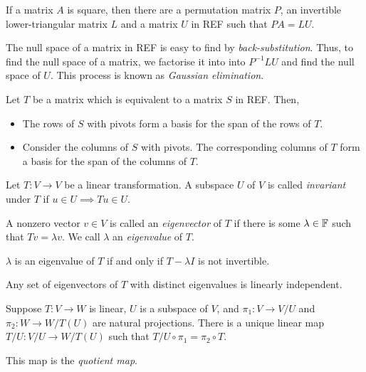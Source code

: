 \begin{prop}[$LU$ Factorisation]
    If a matrix $A$ is square, then there are a permutation matrix $P$, an
    invertible lower-triangular matrix $L$ and a matrix $U$ in REF
    such that $PA=LU$.
\end{prop}
\begin{rem}
    The null space of a matrix in REF is easy to find by
    \emph{back-substitution}.
    Thus, to find the null space of a matrix, we factorise it into into
    $P^{-1}LU$ and find the null space of $U$. This process is known as
    \emph{Gaussian elimination}.
\end{rem}
\begin{prop}
  Let $T$ be a matrix which is equivalent to a matrix $S$ in REF\@. Then,
  \begin{itemize}
    \item The rows of $S$ with pivots form a basis for the span of the rows of $T$.
    \item Consider the columns of $S$ with pivots. The corresponding columns of
      $T$ form a basis for the span of the columns of $T$.
  \end{itemize}
\end{prop}
\begin{defn}
    Let $T:V\to V$ be a linear transformation. A subspace $U$ of $V$ is called
    \emph{invariant} under $T$ if $u\in U\implies Tu\in U$.
\end{defn}
\begin{defn}
  A nonzero vector $v\in V$ is called an \emph{eigenvector} of $T$ if there is
  some $\lambda\in\mathbb{F}$ such that $Tv=\lambda v$. We call $\lambda$ an
  \emph{eigenvalue} of $T$.
\end{defn}
\begin{prop}
  $\lambda$ is an eigenvalue of $T$ if and only if $T-\lambda I$ is not
  invertible.
\end{prop}
\begin{prop}
  Any set of eigenvectors of $T$ with distinct eigenvalues is linearly
  independent.
\end{prop}
\begin{prop}
  Suppose $T:V\to W$ is linear, $U$ is a subspace of $V$, and $\pi_1:V\to V/U$ and
  $\pi_2:W\to W/T(U)$ are natural projections. There is a unique linear map
  $T/U:V/U\to W/T(U)$ such that $T/U\circ\pi_1=\pi_2\circ T$.
\end{prop}
\begin{defn}
    This map is the \emph{quotient map}.
\end{defn}
